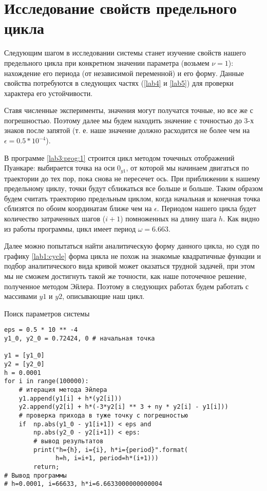 \chapter{Исследование свойств предельного цикла}

Следующим шагом в исследовании системы станет изучение свойств нашего
предельного цикла при конкретном значении параметра (возьмем $\nu = 1$):
нахождение его периода (от независимой переменной) и его форму. Данные свойства
потребуются в следующих частях (\ref{lab4} и \ref{lab5}) для проверки
характера его устойчивости.

Ставя численные эксперименты, значения могут получатся точные, но все же с
погрешностью. Поэтому далее мы будем находить значение с точностью до 3-х знаков
после запятой (т. е. наше значение должно расходится не более чем на
$\epsilon = 0.5 * 10 ^{-4}$).

В программе \ref{lab3:prog:1} строится цикл методом точечных отображений Пуанкаре:
выбирается точка на оси $0_{y1}$, от которой мы начинаем двигаться по траектории
до тех пор, пока снова не пересечет ось. При приближении к нашему предельному
циклу, точки будут сближаться все больше и больше. Таким образом будем считать
траекторию предельным циклом, когда начальная и конечная точка сблизятся по
обоим координатам ближе чем на $\epsilon$. Периодом нашего цикла будет
количество затраченных шагов ($i + 1$) помноженных на длину шага $h$.
Как видно из работы программы, цикл имеет период $\omega = 6.663$.

Далее можно попытаться найти аналитическую форму данного цикла, но судя по
графику \ref{lab1:cycle} форма цикла не похож на знакомые квадратичные функции и
подбор аналитического вида кривой может оказаться трудной задачей, при этом мы
не сможем достигнуть такой же точности, как наше поточечное решение, полученное
методом Эйлера. Поэтому в следующих работах будем работать с массивами $y1$ и
$y2$, описывающие наш цикл.

\begin{program}
    \caption{Поиск параметров системы}
    \label{lab3:prog:1}
    \begin{verbatim}
eps = 0.5 * 10 ** -4
y1_0, y2_0 = 0.72424, 0 # начальная точка

y1 = [y1_0]
y2 = [y2_0]
h = 0.0001
for i in range(100000):
    # итерация метода Эйлера
    y1.append(y1[i] + h*(y2[i]))
    y2.append(y2[i] + h*(-3*y2[i] ** 3 + ny * y2[i] - y1[i]))
    # проверка прихода в туже точку с погрешностью
    if  np.abs(y1_0 - y1[i+1]) < eps and
        np.abs(y2_0 - y2[i+1]) < eps:
        # вывод результатов
        print("h={h}, i={i}, h*i={period}".format(
              h=h, i=i+1, period=h*(i+1)))
        return;
# Вывод программы
# h=0.0001, i=66633, h*i=6.6633000000000004
    \end{verbatim}
\end{program}


